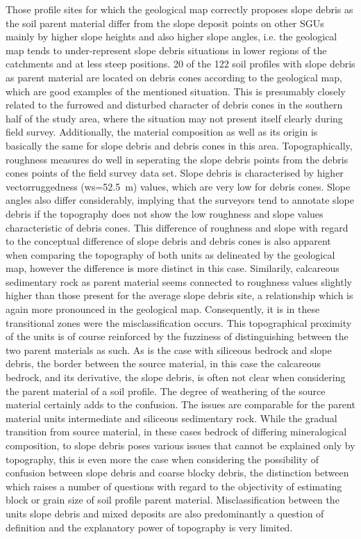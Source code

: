 \documentclass[preprint,12pt,authoryear]{elsarticle}
\begin{document}
Those profile sites for which the geological map correctly proposes slope debris as the soil parent material differ from the slope deposit points on other SGUs mainly by higher slope heights and also higher slope angles, i.e. the geological map tends to under-represent slope debris situations in lower regions of the catchments and at less steep positions. 20 of the 122 soil profiles with slope debris as parent material are located on debris cones according to the geological map, which are good examples of the mentioned situation. This is presumably closely related to the furrowed and disturbed character of debris cones in the southern half of the study area, where the situation may not present itself clearly during field survey. Additionally, the material composition as well as its origin is basically the same for slope debris and debris cones in this area. Topographically, roughness measures do well in seperating the slope debris points from the debris cones points of the field survey data set. Slope debris  is characterised by higher vectorruggedness (ws=52.5~m) values, which are very low for debris cones. Slope angles also differ considerably, implying that the surveyors tend to annotate slope debris if the topography does not show the low roughness and slope values characteristic of debris cones. This difference of roughness and slope with regard to the conceptual difference of slope debris and debris cones is also apparent when comparing the topography of both units as delineated by the geological map, however the difference is more distinct in this case. Similarily, calcareous sedimentary rock as parent material seems connected to roughness values slightly higher than those present for the average slope debris site, a relationship which is again more pronounced in the geological map. Consequently, it is in these transitional zones were the misclassification occurs. This topographical proximity of the units is of course  reinforced by the fuzziness of distinguishing between the two parent materials as such. As is the case with siliceous bedrock and slope debris, the border between the  source material, in this case the calcareous bedrock, and its derivative, the slope debris, is often not clear when considering the parent material of a soil profile. The degree of weathering of the source material certainly adds to the confusion. The  issues are comparable for the parent material units intermediate and siliceous sedimentary rock. While the gradual transition from source material, in these cases bedrock of differing mineralogical composition, to slope debris poses various issues that cannot be explained only by topography, this is even more the case when considering the possibility of confusion between slope debris and coarse blocky debris, the distinction between which raises a number of questions with regard to the objectivity of  estimating block or grain size of soil profile parent material. Misclassification between the units slope debris and mixed deposits are also predominantly a question of definition and the explanatory power of topography is very limited.
\end{document}

